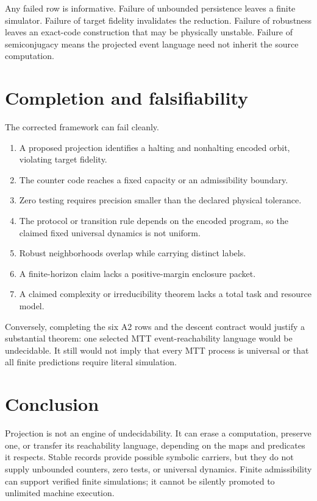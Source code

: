 \documentclass[11pt]{article}
\theoremstyle{definition}
\theoremstyle{remark}
\begin{document}
Any failed row is informative.  Failure of unbounded persistence leaves a
finite simulator.  Failure of target fidelity invalidates the reduction.
Failure of robustness leaves an exact-code construction that may be physically
unstable.  Failure of semiconjugacy means the projected event language need not
inherit the source computation.

\section{Completion and falsifiability}

The corrected framework can fail cleanly.
\begin{enumerate}[label=(F\arabic*)]
\item A proposed projection identifies a halting and nonhalting encoded orbit,
violating target fidelity.
\item The counter code reaches a fixed capacity or an admissibility boundary.
\item Zero testing requires precision smaller than the declared physical
tolerance.
\item The protocol or transition rule depends on the encoded program, so the
claimed fixed universal dynamics is not uniform.
\item Robust neighborhoods overlap while carrying distinct labels.
\item A finite-horizon claim lacks a positive-margin enclosure packet.
\item A claimed complexity or irreducibility theorem lacks a total task and
resource model.
\end{enumerate}

Conversely, completing the six A2 rows and the descent contract would justify a
substantial theorem: one selected MTT event-reachability language would be
undecidable.  It still would not imply that every MTT process is universal or
that all finite predictions require literal simulation.

\section{Conclusion}

Projection is not an engine of undecidability.  It can erase a computation,
preserve one, or transfer its reachability language, depending on the maps and
predicates it respects.  Stable records provide possible symbolic carriers,
but they do not supply unbounded counters, zero tests, or universal dynamics.
Finite admissibility can support verified finite simulations; it cannot be
silently promoted to unlimited machine execution.
\end{document}
